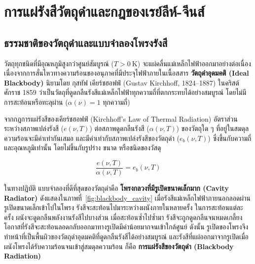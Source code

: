 \section{การแผ่รังสีวัตถุดำและกฎของเรย์ลีห์-จีนส์}

\subsection{ธรรมชาติของวัตถุดำและแบบจำลองโพรงรังสี}

วัตถุทุกชนิดที่มีอุณหภูมิสูงกว่าศูนย์สัมบูรณ์ ($T > 0~\text{K}$) จะแผ่คลื่นแม่เหล็กไฟฟ้าออกมาอย่างต่อเนื่อง เนื่องจากการสั่นไหวทางความร้อนของอนุภาคที่มีประจุไฟฟ้าภายในเนื้อสสาร \textbf{วัตถุดำอุดมคติ (Ideal Blackbody)} นิยามโดย กุสทัฟ เคียร์ชฮอฟฟ์ (Gustav Kirchhoff, 1824--1887) ในคริสต์ศักราช 1859 ว่าเป็นวัตถุที่ดูดกลืนรังสีแม่เหล็กไฟฟ้าทุกความถี่ที่ตกกระทบได้อย่างสมบูรณ์ โดยไม่มีการสะท้อนหรือทะลุผ่าน ($\alpha(\nu) = 1$ ทุกความถี่)

จากกฎการแผ่รังสีของเคียร์ชฮอฟฟ์ (Kirchhoff's Law of Thermal Radiation) อัตราส่วนระหว่างสภาพเปล่งรังสี ($e(\nu, T)$) ต่อสภาพดูดกลืนรังสี ($\alpha(\nu, T)$) ของวัตถุใด ๆ ที่อยู่ในสมดุลความร้อนจะมีค่าเท่ากันเสมอ และมีค่าเท่ากับสภาพเปล่งรังสีของวัตถุดำ ($e_b(\nu, T)$) ซึ่งขึ้นกับความถี่และอุณหภูมิเท่านั้น โดยไม่ขึ้นกับรูปร่าง ขนาด หรือชนิดของวัสดุ

\begin{equation}
\frac{e(\nu, T)}{\alpha(\nu, T)} = e_b(\nu, T)
\label{eq:kirchhoff_law}
\end{equation}

ในทางปฏิบัติ แบบจำลองที่ดีที่สุดของวัตถุดำคือ \textbf{โพรงกลวงที่มีรูเปิดขนาดเล็กมาก (Cavity Radiator)} ดังแสดงในภาพที่~\ref{fig:blackbody_cavity} เมื่อรังสีแม่เหล็กไฟฟ้าภายนอกลอดผ่านรูเปิดขนาดเล็กเข้าไปในโพรง รังสีจะสะท้อนไปมาระหว่างผนังภายในหลายครั้ง ในการสะท้อนแต่ละครั้ง ผนังจะดูดกลืนพลังงานรังสีไปบางส่วน เมื่อสะท้อนซ้ำไปซ้ำมา รังสีจะถูกดูดกลืนจนหมดเกลี้ยง โอกาสที่รังสีจะสะท้อนลอดกลับออกมาทางรูเปิดมีค่าน้อยมากจนเข้าใกล้ศูนย์ ดังนั้น รูเปิดของโพรงจึงทำหน้าที่เป็นพื้นผิวของวัตถุดำอุดมคติที่ดูดกลืนรังสีได้อย่างสมบูรณ์ และรังสีที่แผ่ออกมาจากรูเปิดเมื่อผนังโพรงได้รับความร้อนจนเข้าสู่สมดุลความร้อน ก็คือ \textbf{การแผ่รังสีของวัตถุดำ (Blackbody Radiation)}

